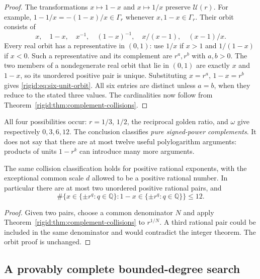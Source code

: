 \begin{proof}
The transformations $x\mapsto1-x$ and $x\mapsto1/x$ preserve
$\mathcal U(r)$.  For example,
$1-1/x=-(1-x)/x\in\Gamma_r$ whenever $x,1-x\in\Gamma_r$.
Their orbit consists of
\[
x,\quad1-x,\quad x^{-1},\quad(1-x)^{-1},
\quad x/(x-1),\quad(x-1)/x.
\]
Every real orbit has a representative in $(0,1)$: use $1/x$ if
$x>1$ and $1/(1-x)$ if $x<0$.  Such a representative and its
complement are $r^a,r^b$ with $a,b>0$.  The two members of a
nondegenerate real orbit that lie in $(0,1)$ are exactly $x$ and
$1-x$, so its unordered positive pair is unique.  Substituting
$x=r^a$, $1-x=r^b$ gives \eqref{rigid:eq:six-unit-orbit}.
All six entries are distinct unless $a=b$, when they reduce to
the stated three values.  The cardinalities now follow from
Theorem~\ref{rigid:thm:complement-collisions}.
\end{proof}

All four possibilities occur: $r=1/3$, $1/2$, the reciprocal golden
ratio, and $\omega$ give respectively $0,3,6,12$.
The conclusion classifies \emph{pure signed-power complements}.
It does not say that there are at most twelve useful polylogarithm
arguments: products of units $1-r^k$ can introduce many more arguments.

\begin{corollary}
\label{rigid:cor:rational-complements}
The same collision classification holds for positive rational
exponents, with the exceptional common scale $d$ allowed to be a
positive rational number.  In particular there are at most two
unordered positive rational pairs, and
\[
\#\{x\in\{\pm r^q:q\in\mathbb Q\}:1-x\in
                          \{\pm r^q:q\in\mathbb Q\}\}\le12.
\]
\end{corollary}

\begin{proof}
Given two pairs, choose a common denominator $N$ and apply
Theorem~\ref{rigid:thm:complement-collisions} to $r^{1/N}$.
A third rational pair could be included in the same denominator
and would contradict the integer theorem.  The orbit proof is
unchanged.
\end{proof}

\subsection{A provably complete bounded-degree search}

